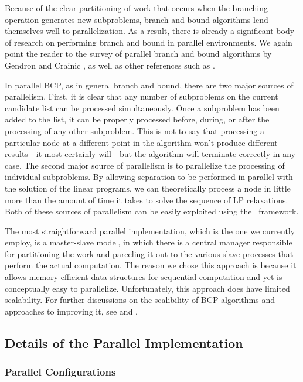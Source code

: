 Because of the clear partitioning of work that occurs when the
branching operation generates new subproblems, branch and bound
algorithms lend themselves well to parallelization. As a result, there
is already a significant body of research on performing branch and
bound in parallel environments. We again point the reader to the
survey of parallel branch and bound algorithms by Gendron and Crainic
\cite{G&C}, as well as other references such as \cite{PICO, G&K, R&K, K&R}.

In parallel BCP, as in general branch and bound, there are two major
sources of parallelism. First, it is clear that any number of
subproblems on the current candidate list can be processed
simultaneously. Once a subproblem has been added to the list, it can
be properly processed before, during, or after the processing of any
other subproblem. This is not to say that processing a particular node
at a different point in the algorithm won't produce different
results---it most certainly will---but the algorithm will terminate
correctly in any case. The second major source of parallelism is to
parallelize the processing of individual subproblems. By allowing
separation to be performed in parallel with the solution of the linear
programs, we can theoretically process a node in little more than the
amount of time it takes to solve the sequence of LP relaxations. Both
of these sources of parallelism can be easily exploited using the
\BB\ framework.

The most straightforward parallel implementation, which is the one we
currently employ, is a master-slave model, in which there is a central
manager responsible for partitioning the work and parceling it out to
the various slave processes that perform the actual computation. The
reason we chose this approach is because it allows memory-efficient
data structures for sequential computation and yet is conceptually
easy to parallelize. Unfortunately, this approach does have limited
scalability. For further discussions on the scalibility of BCP algorithms and
approaches to improving it, see \cite{symphony1} and \cite{ALPS}.

\subsection{Details of the Parallel Implementation}

\subsubsection{Parallel Configurations}

